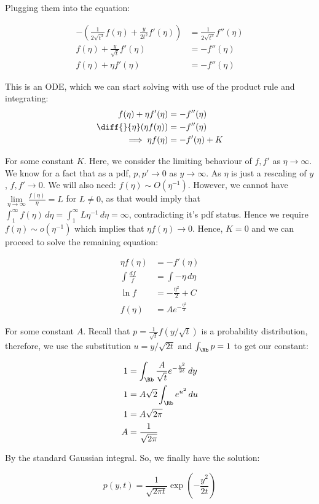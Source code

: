 \documentclass{article}
\begin{document}
	Plugging them into the equation:
	
	\begin{align*}
		 -\left(\frac{1}{2\sqrt{t^3}} f(\eta) + \frac{y}{2t^2} f'(\eta)\right) &= \frac{1}{2\sqrt{t^3}}f''(\eta) \\
		 f(\eta) + \frac{y}{\sqrt{t}} f'(\eta) &= -f''(\eta) \\
		 f(\eta) + \eta f'(\eta) &= -f''(\eta)
	\end{align*}
	
	This is an ODE, which we can start solving with use of the product rule and integrating:
	\begin{align*}
		f(\eta) + \eta f'(\eta) &= -f''(\eta) \\
		\diff{}{\eta} (\eta f(\eta)) &= -f''(\eta) \\
		\implies \eta f(\eta) &= -f'(\eta) + K
	\end{align*}
	
	For some constant $K$. Here, we consider the limiting behaviour of $f,f'$ as $\eta \rightarrow \infty$. We know for a fact that as a pdf, $p,p' \rightarrow 0$ as $y \rightarrow \infty$. As $\eta$ is just a rescaling of $y$,  $f,f' \rightarrow 0$. We will also need: $f(\eta) \sim O(\eta^{-1})$. However, we cannot have $\lim\limits_{\eta \rightarrow \infty} \frac{f(\eta)}{\eta} = L$ for $L \neq 0$, as that would imply that $\int_1^\infty f(\eta) \, d\eta = \int_1^\infty L \eta^{-1} \, d\eta = \infty$, contradicting it's pdf status. Hence we require $ f(\eta) \sim o(\eta^{-1})$ which implies that $\eta f(\eta) \rightarrow 0$. Hence, $K=0$ and we can proceed to solve the remaining equation:
	
	\begin{align*}
		\eta f(\eta) &= -f'(\eta) \\
		\int \frac{df}{f} &= \int -\eta \, d\eta \\
		\ln f &= -\frac{\eta^2}{2} + C \\
		f(\eta) &= Ae^{-\frac{\eta^2}{2}}
	\end{align*}
	
	For some constant $A$. Recall that $p = \frac{1}{\sqrt{t}}f(y/\sqrt{t})$ is a probability distribution, therefore, we use the substitution $u = y / \sqrt{2t}$ and $\int_\Rb p = 1$ to get our constant:
	
	\begin{align*}
		1 &= \int_\Rb \frac{A}{\sqrt{t}} e^{-\frac{y^2}{2t}} \, dy \\
		1 &= A\sqrt{2}\int_\Rb e^{u^2} \, du \\
		1 &= A \sqrt{2\pi} \\
		A &= \frac{1}{\sqrt{2\pi}}
	\end{align*}
	
	By the standard Gaussian integral. So, we finally have the solution:
	
	\begin{equation*}
		p(y,t) = \frac{1}{\sqrt{2 \pi t}} \exp\left(-\frac{y^2}{2t}\right)
	\end{equation*}
\end{document}
